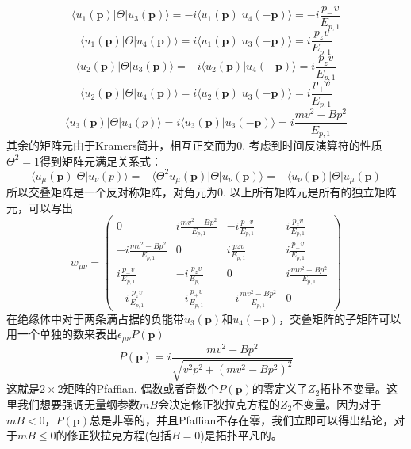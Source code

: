 \documentclass{article}
\numberwithin{equation}{subsection}
\newcommand{\p}{\mathbf{p}}
\begin{document}
\begin{equation}
    \langle u_1(\p)|\Theta|u_3(\p)\rangle=-i\langle u_1(\p)|u_4(-\p)\rangle=-i\frac{p_-v}{E_{p,1}}
\end{equation}
\begin{equation}
    \langle u_1(\p)|\Theta|u_4(\p)\rangle=i\langle u_1(\p)|u_3(-\p)\rangle=i\frac{p_zv}{E_{p,1}}
\end{equation}
\begin{equation}
    \langle u_2(\p)|\Theta|u_3(\p)\rangle=-i\langle u_2(\p)|u_4(-\p)\rangle=i\frac{p_zv}{E_{p,1}}
\end{equation}
\begin{equation}
    \langle u_2(\p)|\Theta|u_4(\p)\rangle=i\langle u_2(\p)|u_3(-\p)\rangle=i\frac{p_+v}{E_{p,1}}
\end{equation}
\begin{equation}
    \langle u_3(\p)|\Theta|u_4(p)\rangle=i\langle u_3(\p)|u_3(-\p)\rangle=i\frac{mv^2-Bp^2}{E_{p,1}}
\end{equation}
其余的矩阵元由于Kramers简并，相互正交而为$0$. 考虑到时间反演算符的性质$\Theta^2=1$得到矩阵元满足关系式：
\begin{equation}
    \langle u_\mu(\p)|\Theta|u_\nu(p)\rangle=-\langle\Theta^2u_\mu(\p)|\Theta|u_\nu(\p)\rangle=-\langle u_\nu(\p)|\Theta|u_\mu(\p)
\end{equation}
所以交叠矩阵是一个反对称矩阵，对角元为$0$. 以上所有矩阵元是所有的独立矩阵元，可以写出
\begin{equation}
    w_{\mu\nu}=\begin{pmatrix}
        0&i\frac{mv^2-Bp^2}{E_{p,1}}&-i\frac{p_-v}{E_{p,1}}&i\frac{p_zv}{E_{p,1}}\\
        -i\frac{mv^2-Bp^2}{E_{p,1}}&0&i\frac{pzv}{E_{p,1}}&i\frac{p_+v}{E_{p,1}}\\
        i\frac{p_-v}{E_{p,1}}&-i\frac{p_zv}{E_{p,1}}&0&i\frac{mv^2-Bp^2}{E_{p,1}}\\
        -i\frac{p_zv}{E_{p,1}}&-i\frac{p_+v}{E_{p,1}}&-i\frac{mv^2-Bp^2}{E_{p,1}}&0
    \end{pmatrix}
\end{equation}
在绝缘体中对于两条满占据的负能带$u_3(\p)$和$u_4(-\p)$，交叠矩阵的子矩阵可以用一个单独的数来表出$\epsilon_{\mu\nu}P(\p)$
\begin{equation}
    P(\p)=i\frac{mv^2-Bp^2}{\sqrt{v^2p^2+(mv^2-Bp^2)^2}}
\end{equation}
这就是$2\times2$矩阵的Pfaffian. 偶数或者奇数个$P(\p)$的零定义了$Z_2$拓扑不变量。这里我们想要强调无量纲参数$mB$会决定修正狄拉克方程的$Z_2$不变量。因为对于$mB<0$，$P(\p)$总是非零的，并且Pfaffian不存在零，我们立即可以得出结论，对于$mB\leq0$的修正狄拉克方程(包括$B=0$)是拓扑平凡的。
\end{document}
